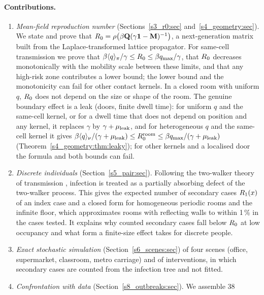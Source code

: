 \paragraph{Contributions.}
\begin{enumerate}[label=(\roman*),leftmargin=2.2em,itemsep=1pt,topsep=3pt]
\item \emph{Mean-field reproduction number} (Sections~\ref{s3_r0:sec} and~\ref{s4_geometry:sec}). We state
  and prove that $R_0=\rho\bigl(\beta\mathbf{Q}(\gamma\mathbf{1}-\mathbf{M})^{-1}\bigr)$, a next-generation matrix built from the
  Laplace-transformed lattice propagator. For same-cell transmission we prove that
  $\beta\langle q\rangle_{\pi}/\gamma\le R_0\le\beta q_{\max}/\gamma$, that $R_0$ decreases monotonically with the mobility scale
  between these limits, and that any high-risk zone contributes a lower bound; the lower bound and the
  monotonicity can fail for other contact kernels. In a closed room with uniform $q$, $R_0$ does not depend on
  the size or shape of the room. The genuine boundary effect is a leak (doors, finite dwell
  time): for uniform $q$ and the same-cell kernel, or for a dwell time that does not depend on position and
  any kernel, it replaces $\gamma$ by $\gamma+\mu_{\mathrm{leak}}$, and for heterogeneous $q$ and the same-cell kernel it
  gives $\beta\langle q\rangle_\nu/(\gamma+\mu_{\mathrm{leak}})\le R_0^{\mathrm{room}}\le\beta q_{\max}/(\gamma+\mu_{\mathrm{leak}})$
  (Theorem~\ref{s4_geometry:thm:leaky}); for other kernels and a localised door the formula and both bounds
  can fail.
\item \emph{Discrete individuals} (Section~\ref{s5_pair:sec}). Following the two-walker theory of
  transmission \citep{kenkre2014theory,giuggioli2022spatio}, infection is treated as a partially absorbing
  defect of the two-walker process. This gives the expected number of secondary cases $R_1(x)$ of an index
  case and a closed form for homogeneous periodic rooms and the infinite floor, which approximates rooms with
  reflecting walls to within 1\,\% in the cases tested. It explains why counted secondary cases fall below
  $R_0$ at low occupancy and what form a finite-size effect takes for discrete people.
\item \emph{Exact stochastic simulation} (Section~\ref{s6_scenes:sec}) of four scenes (office, supermarket,
  classroom, metro carriage) and of interventions, in which secondary cases are counted from the infection
  tree and not fitted.
\item \emph{Confrontation with data} (Section~\ref{s8_outbreaks:sec}). We assemble 38

\end{enumerate}
